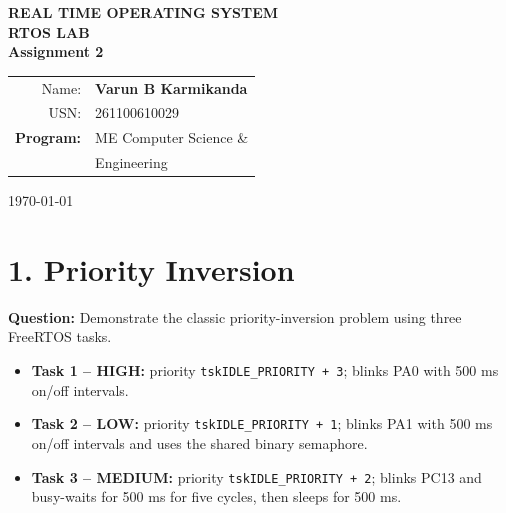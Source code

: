 ﻿\documentclass[12pt,a4paper]{article}
\begin{document}
\begin{titlepage}
    \centering
    \vspace*{2cm}
    {\Large\textbf{REAL TIME OPERATING SYSTEM}}\\[0.7cm]
    {\Large\textbf{RTOS LAB}}\\[1.2cm]
    {\Huge\textbf{Assignment 2}}\\[2cm]
    \begin{tabular}{r p{7.5cm}}
    \Large{Name:}     & {\Large\textbf{Varun B Karmikanda}} \\[0.4cm]
    \Large{USN:}      & {\Large{261100610029}} \\[0.4cm]
    \textbf{Program:} & ME Computer Science \& \\[0.1cm]
                      & Engineering
\end{tabular}
    \vfill
    {\large \today}
\end{titlepage}

\section*{1. Priority Inversion}
\textbf{Question:} Demonstrate the classic priority-inversion problem using
three FreeRTOS tasks.

\begin{itemize}[noitemsep]
    \item \textbf{Task 1 -- HIGH:} priority
          \texttt{tskIDLE\_PRIORITY + 3}; blinks PA0 with 500 ms on/off
          intervals.
    \item \textbf{Task 2 -- LOW:} priority
          \texttt{tskIDLE\_PRIORITY + 1}; blinks PA1 with 500 ms on/off
          intervals and uses the shared binary semaphore.
    \item \textbf{Task 3 -- MEDIUM:} priority
          \texttt{tskIDLE\_PRIORITY + 2}; blinks PC13 and busy-waits for
          500 ms for five cycles, then sleeps for 500 ms.
\end{itemize}
\end{document}
